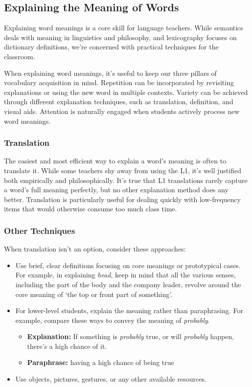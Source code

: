 \subsection{Explaining the Meaning of Words}\label{sec:explaining-words}

Explaining word meanings is a core skill for language teachers. While semantics deals with meaning in linguistics and philosophy, and lexicography focuses on dictionary definitions, we're concerned with practical techniques for the classroom.

When explaining word meanings, it's useful to keep our three pillars of vocabulary acquisition in mind. Repetition can be incorporated by revisiting explanations or using the new word in multiple contexts. Variety can be achieved through different explanation techniques, such as translation, definition, and visual aids. Attention is naturally engaged when students actively process new word meanings.

\subsubsection{Translation}

The easiest and most efficient way to explain a word's meaning is often to translate it. While some teachers shy away from using the L1, it's well justified both empirically and philosophically. It's true that L1 translations rarely capture a word's full meaning perfectly, but no other explanation method does any better. Translation is particularly useful for dealing quickly with low-frequency items that would otherwise consume too much class time.

\subsubsection{Other Techniques}

When translation isn't an option, consider these approaches:

\begin{itemize}
    \item Use brief, clear definitions focusing on core meanings or prototypical cases. For example, in explaining \textit{head}, keep in mind that all the various senses, including the part of the body and the company leader, revolve around the core meaning of `the top or front part of something'.
    \item For lower-level students, explain the meaning rather than paraphrasing. For example, compare these ways to convey the meaning of \textit{probably}.
    \begin{itemize}
        \item \textbf{Explanation:} If something is \textit{probably} true, or will \textit{probably} happen, there's a high chance of it.
        \item \textbf{Paraphrase:} having a high chance of being true
    \end{itemize}
    \item Use objects, pictures, gestures, or any other available resources.
\end{itemize}

